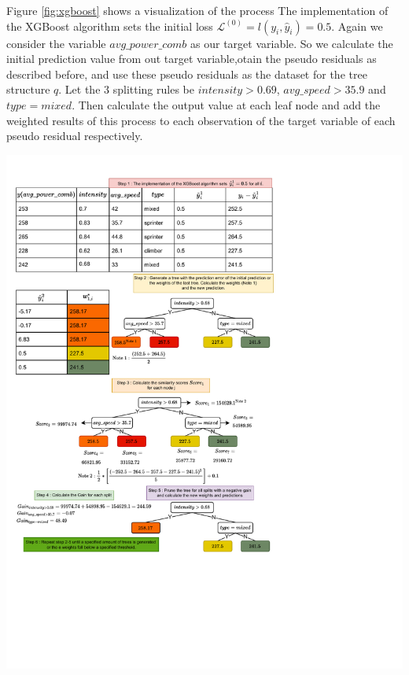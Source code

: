 \documentclass[12pt,a4paper]{article}
\let\origfigure\figure
\let\endorigfigure\endfigure
\renewenvironment{figure}[1][2] {
    \expandafter\origfigure\expandafter[H]
} {
    \endorigfigure
}
\begin{document}
Figure \ref{fig:xgboost} shows a visualization of the process The implementation of the XGBoost algorithm sets the initial loss \(\mathcal{L}^{(0)} = l(y_i,\hat{y}_i) = 0.5\).
Again we consider the variable \(avg\_power\_comb\) as our target variable. So we calculate the initial prediction value from out target variable,otain the pseudo residuals as described before, and use these pseudo residuals as the dataset for the tree structure \(q\). Let the 3 splitting rules be \(intensity>0.69\), \(avg\_speed>35.9\) and \(type = mixed\). Then calculate the output value at each leaf node and add the weighted results of this process to each observation of the target variable of each pseudo residual respectively.

\begin{figure}
\centering
\includegraphics[height = 1.7\linewidth, width = 1.5\linewidth,trim=0.21in 1in 0in 0.0in,clip]{./includes/XGBoost.pdf}
\vspace{-3.6cm}\caption{The diagram shows exemplary how XGBoost initiates the algorithm, builds trees, calculates the weights and updates the model.}
\label{fig:xgboost}
\end{figure}
\end{document}
